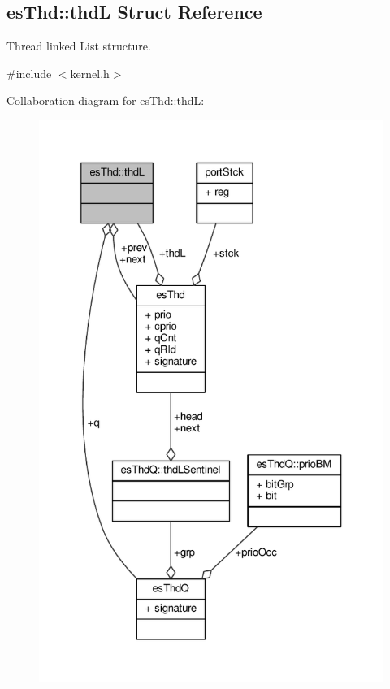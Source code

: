\hypertarget{structesThd_1_1thdL}{\subsection{es\-Thd\-:\-:thd\-L Struct Reference}
\label{structesThd_1_1thdL}
}


Thread linked List structure.  




{\ttfamily \#include $<$kernel.\-h$>$}



Collaboration diagram for es\-Thd\-:\-:thd\-L\-:\nopagebreak
\begin{figure}[H]
\begin{center}
\leavevmode
\includegraphics[width=326pt]{structesThd_1_1thdL__coll__graph}
\end{center}
\end{figure}
